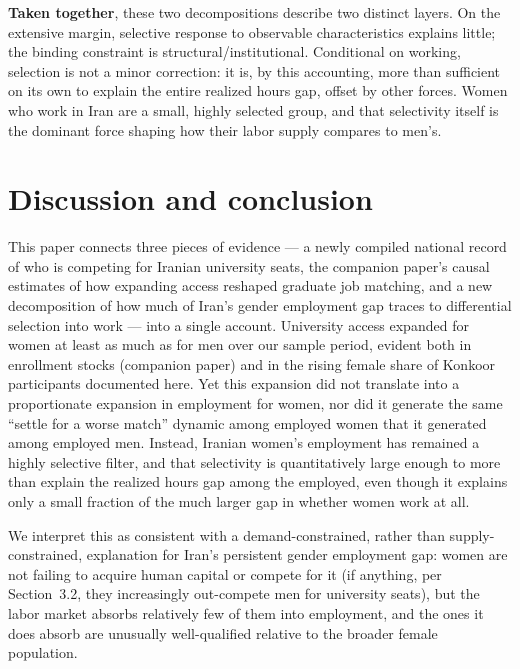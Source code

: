 \documentclass[11pt]{article}
\begin{document}
\textbf{Taken together}, these two decompositions describe two distinct layers. On the extensive margin, selective response to observable characteristics explains little; the binding constraint is structural/institutional. Conditional on working, selection is not a minor correction: it is, by this accounting, more than sufficient on its own to explain the entire realized hours gap, offset by other forces. Women who work in Iran are a small, highly selected group, and that selectivity itself is the dominant force shaping how their labor supply compares to men's.

\section{Discussion and conclusion}

This paper connects three pieces of evidence --- a newly compiled national record of who is competing for Iranian university seats, the companion paper's causal estimates of how expanding access reshaped graduate job matching, and a new decomposition of how much of Iran's gender employment gap traces to differential selection into work --- into a single account. University access expanded for women at least as much as for men over our sample period, evident both in enrollment stocks (companion paper) and in the rising female share of Konkoor participants documented here. Yet this expansion did not translate into a proportionate expansion in employment for women, nor did it generate the same ``settle for a worse match'' dynamic among employed women that it generated among employed men. Instead, Iranian women's employment has remained a highly selective filter, and that selectivity is quantitatively large enough to more than explain the realized hours gap among the employed, even though it explains only a small fraction of the much larger gap in whether women work at all.

We interpret this as consistent with a demand-constrained, rather than supply-constrained, explanation for Iran's persistent gender employment gap: women are not failing to acquire human capital or compete for it (if anything, per Section~3.2, they increasingly out-compete men for university seats), but the labor market absorbs relatively few of them into employment, and the ones it does absorb are unusually well-qualified relative to the broader female population.
\end{document}
